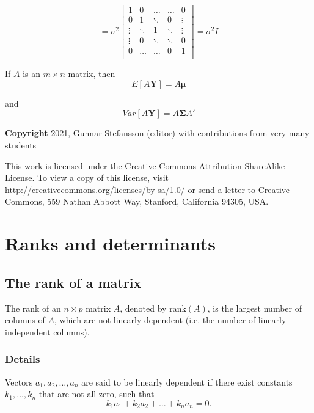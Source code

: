 \documentclass[12pt,a4paper]{article}
\theoremstyle{regla}
\theoremstyle{remark}
\theoremstyle{definition}
\theoremstyle{nonumberbreak}
\begin{document}
\[
 = 
\sigma^2
\left[
\begin{array}{ccccc}
1 & 0 & \ldots & \ldots & 0 \\
 0 & 1 & \ddots & 0  & \vdots \\
 \vdots & \ddots  & 1  & \ddots & \vdots \\
\vdots & 0 & \ddots & \ddots & 0 \\
0 & \ldots & \ldots & 0 & 1 \\ 
\end{array} \right]
= \sigma^2 I
\]



If $A$ is an $m \times n$ matrix, then \\

$$ E[A\mathbf{Y}] = A \mathbf{\mu} $$

and
$$ Var[A\mathbf{Y}] = A \boldsymbol{\Sigma} A' $$

{\bf Copyright}
2021, Gunnar Stefansson (editor) with contributions from very many students

This work is licensed under the Creative Commons
Attribution-ShareAlike License. To view a copy of this license, visit
http://creativecommons.org/licenses/by-sa/1.0/ or send a letter to
Creative Commons, 559 Nathan Abbott Way, Stanford, California 94305,
USA.
\clearpage
\section{Ranks and determinants}
\subsection{The rank of a matrix}
\begin{fbox}
\begin{minipage}{0.97\textwidth}
The rank of an $n \times p$ matrix $A$, denoted by $\text{rank}(A)$, is the largest number of columns of  $A$, which are not linearly dependent (i.e. the number of linearly independent columns).
\end{minipage}
\end{fbox}
\subsubsection{Details}
Vectors $a_1, a_2, \ldots, a_n$ are said to be linearly dependent if there exist constants $k_1 , \ldots, k_n$ that are not all zero, such that 
$$ k_1 a_1 + k_2 a_2 + \ldots + k_n a_n = 0.$$
\end{document}
